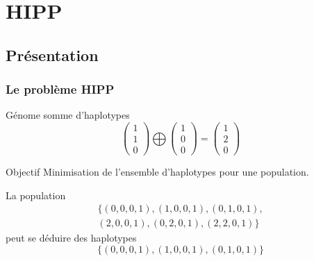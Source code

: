 \documentclass{beamer}
\begin{document}
\section{HIPP}
\subsection{Présentation}
\begin{frame}
    \frametitle{Le problème HIPP}
    \begin{block}{Génome somme d'haplotypes}
            \[ \left(\begin{array}{c} 1 \\ 1 \\ 0 \end{array}\right) \bigoplus \left(\begin{array}{c} 1 \\ 0 \\ 0\end{array}\right) =
                \left(\begin{array}{c} 1 \\ 2 \\ 0 \end{array}\right) \]
    \end{block}
    \begin{block}{Objectif}
        Minimisation de l'ensemble d'haplotypes pour une population.
    \end{block}
    La population
    \[\begin{array}{c} \{(0,0,0,1),(1,0,0,1),(0,1,0,1), \\ (2,0,0,1),(0,2,0,1),(2,2,0,1)\}\end{array} \]
    peut se déduire des haplotypes
    \[\{(0,0,0,1),(1,0,0,1),(0,1,0,1)\}\]
\end{frame}
\end{document}
